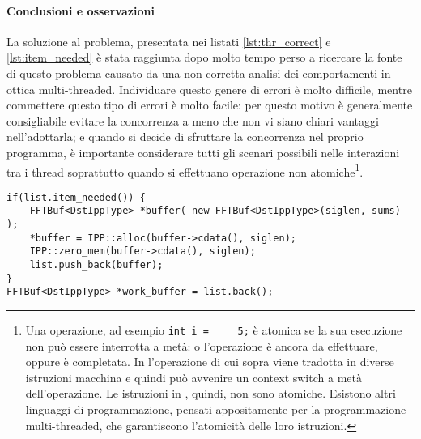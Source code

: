 \paragraph{Conclusioni e osservazioni}
La soluzione al problema, presentata nei listati \ref{lst:thr_correct} e
\ref{lst:item_needed} \`e stata raggiunta dopo molto tempo perso a ricercare la
fonte di questo problema causato da una non corretta analisi dei comportamenti
in ottica multi-threaded.  Individuare questo genere di errori \`e molto
difficile, mentre commettere questo tipo di errori \`e molto facile: per questo
motivo \`e generalmente consigliabile evitare la concorrenza a meno che non vi
siano chiari vantaggi nell'adottarla; e quando si decide di sfruttare la
concorrenza nel proprio programma, \`e importante considerare tutti gli scenari
possibili nelle interazioni tra i thread soprattutto quando si effettuano
operazione non atomiche\footnote{Una operazione, ad esempio \lstinline$int i =
    5;$ \`e atomica se la sua esecuzione non pu\`o essere interrotta a met\`a: o
        l'operazione \`e ancora da effettuare, oppure \`e completata. In \CC 
        l'operazione di cui sopra viene tradotta in diverse istruzioni macchina
        e quindi pu\`o avvenire un context switch a met\`a dell'operazione. Le
        istruzioni in \CC, quindi, non sono atomiche. Esistono altri linguaggi
        di programmazione, pensati appositamente per la programmazione
        multi-threaded, che garantiscono l'atomicit\`a delle loro istruzioni.}.
\begin{lstlisting}[float,label=lst:thr_correct,caption=Codice funzionante anche
in ambiente multi-threaded]
if(list.item_needed()) {
	FFTBuf<DstIppType> *buffer( new FFTBuf<DstIppType>(siglen, sums) );
	*buffer = IPP::alloc(buffer->cdata(), siglen);
	IPP::zero_mem(buffer->cdata(), siglen);
	list.push_back(buffer);
}
FFTBuf<DstIppType> *work_buffer = list.back();
\end{lstlisting}


